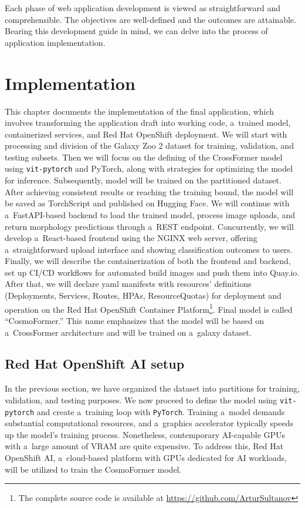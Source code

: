 Each phase of web application development is viewed as straightforward and comprehensible. The objectives are well-defined and the outcomes are attainable. Bearing this development guide in mind, we can delve into the process of application implementation.

\chapter{Implementation}
\label{chapter:implementation}

This chapter documents the implementation of the final application, which involves transforming the application draft into working code, a~trained model, containerized services, and Red Hat OpenShift deployment. We will start with processing and division of the Galaxy Zoo 2 dataset for training, validation, and testing subsets. Then we will focus on the defining of the CrossFormer model using \texttt{vit-pytorch} and PyTorch, along with strategies for optimizing the model for inference. Subsequently, model will be trained on the partitioned dataset. After achieving consistent results or reaching the training bound, the model will be saved as TorchScript and published on Hugging Face. We will continue with a~FastAPI-based backend to load the trained model, process image uploads, and return morphology predictions through a~REST endpoint. Concurrently, we will develop a~React-based frontend using the NGINX web server, offering a~straightforward upload interface and showing classification outcomes to users. Finally, we will describe the containerization of both the frontend and backend, set up CI/CD workflows for automated build images and push them into Quay.io. After that, we will declare yaml manifests with resources' definitions (Deployments, Services, Routes, HPAs, ResourceQuotas) for deployment and operation on the Red Hat OpenShift Container Platform\footnote{The complete source code is available at \url{https://github.com/ArturSultanov}}. Final model is called \enquote{CosmoFormer.} This name emphasizes that the model will be based on a~CrossFormer architecture and will be trained on a~galaxy dataset.

\section{Red Hat OpenShift AI setup}

In the previous section, we have organized the dataset into partitions for training, validation, and testing purposes. We now proceed to define the model using \texttt{vit-pytorch} and create a~training loop with \texttt{PyTorch}. Training a~model demands substantial computational resources, and a~graphics accelerator typically speeds up the model’s training process. Nonetheless, contemporary AI-capable GPUs with a~large amount of VRAM are quite expensive. To address this, Red Hat OpenShift AI, a~cloud-based platform with GPUs dedicated for AI workloads, will be utilized to train the CosmoFormer model.


